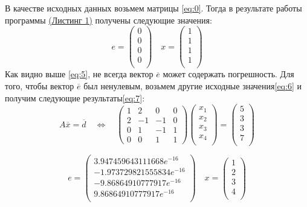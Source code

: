 \documentclass[a4paper, 12pt]{article}   	%
\begin{document}
В качестве исходных данных возьмем матрицы \eqref{eq:0}. Тогда в результате работы программы  \hyperlink{lst:gauss}{(Листинг 1)} получены следующие значения:
\begin{equation}\label{eq:5}
e = 
\left(\begin{array}{c} 
0 \\
0 \\
0 \\
0 \\
\end{array}\right)
\quad
x =
 \left(\begin{array}{c} 
1 \\
1 \\
1 \\
1 \\
\end{array}\right)
\end{equation}
Как видно выше \eqref{eq:5}, не всегда вектор $\overline{e}$ может содержать погрешность. Для того, чтобы вектор $\overline{e}$ был ненулевым, возьмем другие исходные значения\eqref{eq:6} и получим следующие результаты\eqref{eq:7}:
\begin{equation}\label{eq:6}
A\overline{x}=\overline{d}
\quad   \Leftrightarrow \quad
\left(\begin{array}{cccc} 
1 & 2 & 0 & 0 \\
2 & -1 & -1 & 0 \\
0 & 1 & -1 & 1 \\
0 & 0 & 1 & 1  
\end{array}\right)
\left(\begin{array}{c} 
x_1 \\
x_2 \\
x_3 \\
x_4 \\
\end{array}\right)
 =
 \left(\begin{array}{c} 
5 \\
3 \\
3 \\
7 \\
\end{array}\right)
\end{equation}

\begin{equation}\label{eq:7}
e = 
\left(\begin{array}{c} 
3.947459643111668e^{-16} \\
-1.973729821555834e^{-16} \\
-9.86864910777917e^{-16} \\
9.86864910777917e^{-16} \\
\end{array}\right)
\quad
x =
 \left(\begin{array}{c} 
1 \\
2 \\
3 \\
4 \\
\end{array}\right)
\end{equation}
\\
\end{document}

